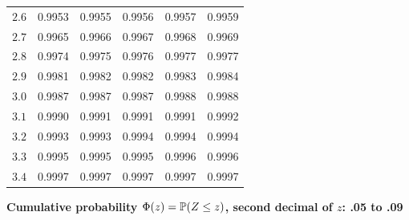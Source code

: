 \begin{center}
\begin{tabular}{c|ccccc}
$2.6$ & 0.9953 & 0.9955 & 0.9956 & 0.9957 & 0.9959 \\
$2.7$ & 0.9965 & 0.9966 & 0.9967 & 0.9968 & 0.9969 \\
$2.8$ & 0.9974 & 0.9975 & 0.9976 & 0.9977 & 0.9977 \\
$2.9$ & 0.9981 & 0.9982 & 0.9982 & 0.9983 & 0.9984 \\
$3.0$ & 0.9987 & 0.9987 & 0.9987 & 0.9988 & 0.9988 \\
$3.1$ & 0.9990 & 0.9991 & 0.9991 & 0.9991 & 0.9992 \\
$3.2$ & 0.9993 & 0.9993 & 0.9994 & 0.9994 & 0.9994 \\
$3.3$ & 0.9995 & 0.9995 & 0.9995 & 0.9996 & 0.9996 \\
$3.4$ & 0.9997 & 0.9997 & 0.9997 & 0.9997 & 0.9997 \\
\bottomrule
\end{tabular}
\end{center}

\textbf{Cumulative probability $\Phi(z)=\mathbb{P}(Z\le z)$, second decimal of $z$: .05 to .09}

